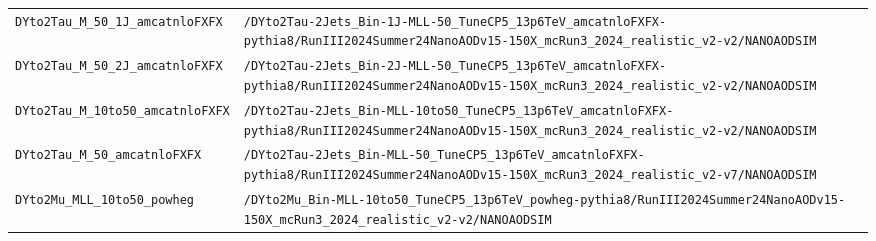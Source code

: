 \begin{longtable}{@{}>{\RaggedRight\arraybackslash}p{} >{\RaggedRight\arraybackslash}p{}@{}}
\addlinespace[2pt]
\texttt{DYto2Tau\_\allowbreak{}M\_\allowbreak{}50\_\allowbreak{}1J\_\allowbreak{}amcatnloFXFX} & \texttt{/\allowbreak{}DYto2Tau-\allowbreak{}2Jets\_\allowbreak{}Bin-\allowbreak{}1J-\allowbreak{}MLL-\allowbreak{}50\_\allowbreak{}TuneCP5\_\allowbreak{}13p6TeV\_\allowbreak{}amcatnloFXFX-\allowbreak{}pythia8/\allowbreak{}RunIII2024Summer24NanoAODv15-\allowbreak{}150X\_\allowbreak{}mcRun3\_\allowbreak{}2024\_\allowbreak{}realistic\_\allowbreak{}v2-\allowbreak{}v2/\allowbreak{}NANOAODSIM} \\
\addlinespace[2pt]
\texttt{DYto2Tau\_\allowbreak{}M\_\allowbreak{}50\_\allowbreak{}2J\_\allowbreak{}amcatnloFXFX} & \texttt{/\allowbreak{}DYto2Tau-\allowbreak{}2Jets\_\allowbreak{}Bin-\allowbreak{}2J-\allowbreak{}MLL-\allowbreak{}50\_\allowbreak{}TuneCP5\_\allowbreak{}13p6TeV\_\allowbreak{}amcatnloFXFX-\allowbreak{}pythia8/\allowbreak{}RunIII2024Summer24NanoAODv15-\allowbreak{}150X\_\allowbreak{}mcRun3\_\allowbreak{}2024\_\allowbreak{}realistic\_\allowbreak{}v2-\allowbreak{}v2/\allowbreak{}NANOAODSIM} \\
\addlinespace[2pt]
\texttt{DYto2Tau\_\allowbreak{}M\_\allowbreak{}10to50\_\allowbreak{}amcatnloFXFX} & \texttt{/\allowbreak{}DYto2Tau-\allowbreak{}2Jets\_\allowbreak{}Bin-\allowbreak{}MLL-\allowbreak{}10to50\_\allowbreak{}TuneCP5\_\allowbreak{}13p6TeV\_\allowbreak{}amcatnloFXFX-\allowbreak{}pythia8/\allowbreak{}RunIII2024Summer24NanoAODv15-\allowbreak{}150X\_\allowbreak{}mcRun3\_\allowbreak{}2024\_\allowbreak{}realistic\_\allowbreak{}v2-\allowbreak{}v2/\allowbreak{}NANOAODSIM} \\
\addlinespace[2pt]
\texttt{DYto2Tau\_\allowbreak{}M\_\allowbreak{}50\_\allowbreak{}amcatnloFXFX} & \texttt{/\allowbreak{}DYto2Tau-\allowbreak{}2Jets\_\allowbreak{}Bin-\allowbreak{}MLL-\allowbreak{}50\_\allowbreak{}TuneCP5\_\allowbreak{}13p6TeV\_\allowbreak{}amcatnloFXFX-\allowbreak{}pythia8/\allowbreak{}RunIII2024Summer24NanoAODv15-\allowbreak{}150X\_\allowbreak{}mcRun3\_\allowbreak{}2024\_\allowbreak{}realistic\_\allowbreak{}v2-\allowbreak{}v7/\allowbreak{}NANOAODSIM} \\
\addlinespace[2pt]
\texttt{DYto2Mu\_\allowbreak{}MLL\_\allowbreak{}10to50\_\allowbreak{}powheg} & \texttt{/\allowbreak{}DYto2Mu\_\allowbreak{}Bin-\allowbreak{}MLL-\allowbreak{}10to50\_\allowbreak{}TuneCP5\_\allowbreak{}13p6TeV\_\allowbreak{}powheg-\allowbreak{}pythia8/\allowbreak{}RunIII2024Summer24NanoAODv15-\allowbreak{}150X\_\allowbreak{}mcRun3\_\allowbreak{}2024\_\allowbreak{}realistic\_\allowbreak{}v2-\allowbreak{}v2/\allowbreak{}NANOAODSIM} \\

\end{longtable}
